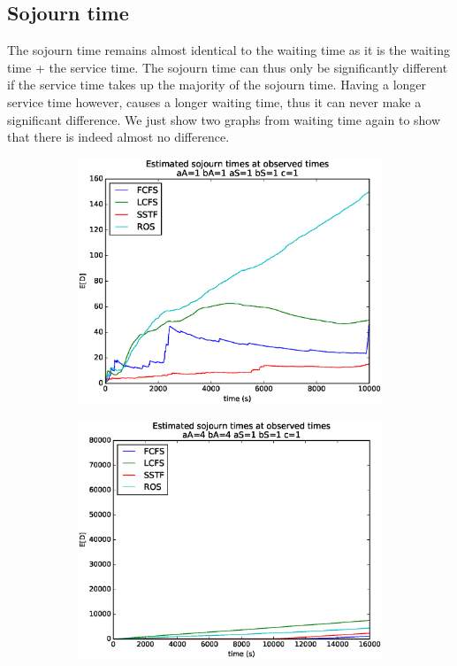 \documentclass[a4paper]{article}
\begin{document}
\subsection{Sojourn time}
The sojourn time remains almost identical to the waiting time as it is the waiting time + the service time. The sojourn time can thus only be significantly different if the service time takes up the majority of the sojourn time. Having a longer service time however, causes a longer waiting time, thus it can never make a significant difference. We just show two graphs from waiting time again to show that there is indeed almost no difference.
\begin{figure}[H]
\begin{subfigure}{.5\textwidth}
  \centering
  \includegraphics[width=\linewidth]{../figures/sojourn_times11111}
  \label{fig:st}
\end{subfigure}
\begin{subfigure}{.5\textwidth}
  \centering
  \includegraphics[width=\linewidth]{../figures/sojourn_times44111}
  \label{fig:sta}
\end{subfigure}
\end{figure}
\end{document}
